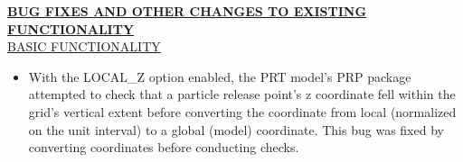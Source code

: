	
	\item \currentmodflowversion
	


	\textbf{\underline{BUG FIXES AND OTHER CHANGES TO EXISTING FUNCTIONALITY}} \\
	\underline{BASIC FUNCTIONALITY}
	\begin{itemize}
		\item With the LOCAL_Z option enabled, the PRT model's PRP package attempted to check that a particle release point's z coordinate fell within the grid's vertical extent before converting the coordinate from local (normalized on the unit interval) to a global (model) coordinate. This bug was fixed by converting coordinates before conducting checks.
	\end{itemize}







